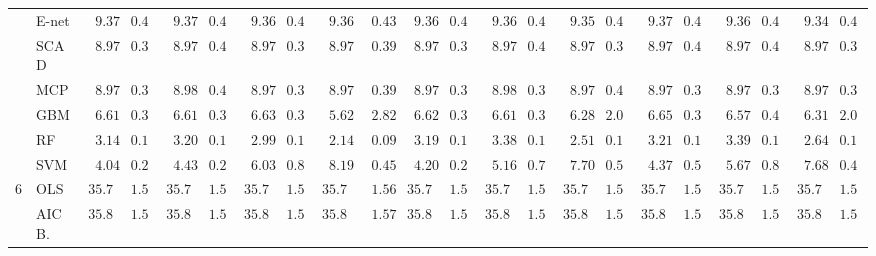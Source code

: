 \begin{tabular}{llllllllllllllllllllll}
	& E-net  & $\phantom{0}9.37$ & $0.44$ & $\phantom{0}9.37$ & $0.43$ & $\phantom{0}9.36$ & $0.43$ & $\phantom{0}9.36$ & $\phantom{0}0.43$ & $\phantom{0}9.36$ & $0.43$ & $\phantom{0}9.36$ & $0.43$ & $\phantom{0}9.35$ & $0.43$ & $\phantom{0}9.37$ & $0.43$ & $\phantom{0}9.36$ & $0.43$ & $\phantom{0}9.34$ & $0.43$ \\
	& SCAD  & $\phantom{0}8.97$ & $0.39$ & $\phantom{0}8.97$ & $0.40$ & $\phantom{0}8.97$ & $0.39$ & $\phantom{0}8.97$ & $\phantom{0}0.39$ & $\phantom{0}8.97$ & $0.39$ & $\phantom{0}8.97$ & $0.40$ & $\phantom{0}8.97$ & $0.39$ & $\phantom{0}8.97$ & $0.40$ & $\phantom{0}8.97$ & $0.40$ & $\phantom{0}8.97$ & $0.39$ \\
	& MCP  & $\phantom{0}8.97$ & $0.39$ & $\phantom{0}8.98$ & $0.40$ & $\phantom{0}8.97$ & $0.39$ & $\phantom{0}8.97$ & $\phantom{0}0.39$ & $\phantom{0}8.97$ & $0.39$ & $\phantom{0}8.98$ & $0.39$ & $\phantom{0}8.97$ & $0.40$ & $\phantom{0}8.97$ & $0.39$ & $\phantom{0}8.97$ & $0.39$ & $\phantom{0}8.97$ & $0.39$ \\
	& GBM  & $\phantom{0}6.61$ & $0.34$ & $\phantom{0}6.61$ & $0.34$ & $\phantom{0}6.63$ & $0.38$ & $\phantom{0}5.62$ & $\phantom{0}2.82$ & $\phantom{0}6.62$ & $0.33$ & $\phantom{0}6.61$ & $0.38$ & $\phantom{0}6.28$ & $2.09$ & $\phantom{0}6.65$ & $0.34$ & $\phantom{0}6.57$ & $0.41$ & $\phantom{0}6.31$ & $2.09$ \\
	& RF  & $\phantom{0}3.14$ & $0.13$ & $\phantom{0}3.20$ & $0.14$ & $\phantom{0}2.99$ & $0.14$ & $\phantom{0}2.14$ & $\phantom{0}0.09$ & $\phantom{0}3.19$ & $0.12$ & $\phantom{0}3.38$ & $0.13$ & $\phantom{0}2.51$ & $0.11$ & $\phantom{0}3.21$ & $0.13$ & $\phantom{0}3.39$ & $0.14$ & $\phantom{0}2.64$ & $0.12$ \\
	& SVM  & $\phantom{0}4.04$ & $0.26$ & $\phantom{0}4.43$ & $0.28$ & $\phantom{0}6.03$ & $0.86$ & $\phantom{0}8.19$ & $\phantom{0}0.45$ & $\phantom{0}4.20$ & $0.27$ & $\phantom{0}5.16$ & $0.79$ & $\phantom{0}7.70$ & $0.53$ & $\phantom{0}4.37$ & $0.50$ & $\phantom{0}5.67$ & $0.88$ & $\phantom{0}7.68$ & $0.47$ \\
	6 & OLS  & $35.73$ & $1.56$ & $35.73$ & $1.56$ & $35.73$ & $1.56$ & $35.73$ & $\phantom{0}1.56$ & $35.73$ & $1.56$ & $35.73$ & $1.56$ & $35.73$ & $1.56$ & $35.73$ & $1.56$ & $35.73$ & $1.56$ & $35.73$ & $1.56$ \\
	& AIC B.  & $35.83$ & $1.56$ & $35.82$ & $1.56$ & $35.82$ & $1.56$ & $35.84$ & $\phantom{0}1.57$ & $35.83$ & $1.57$ & $35.82$ & $1.56$ & $35.82$ & $1.56$ & $35.83$ & $1.56$ & $35.82$ & $1.56$ & $35.83$ & $1.56$ \\

\end{tabular}
